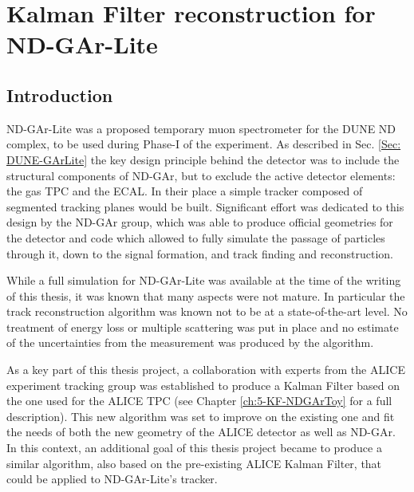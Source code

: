 


\chapter{\label{ch:4-KF-NDGArLite}Kalman Filter reconstruction for ND-GAr-Lite}
\minitoc

\section{Introduction}
ND-GAr-Lite was a proposed temporary muon spectrometer  for the DUNE ND complex, to be used during Phase-I of the experiment. As described in Sec. \ref{Sec: DUNE-GArLite} the key design principle behind the detector was to include the structural components of ND-GAr, but to exclude the active detector elements: the gas TPC and the ECAL. In their place a simple tracker composed of segmented tracking planes would be built. Significant effort was dedicated to this design by the ND-GAr group, which was able to produce official geometries for the detector and code which allowed to fully simulate the passage of particles through it, down to the signal formation, and track finding and reconstruction.

While a full simulation for ND-GAr-Lite was available at the time of the writing of this thesis, it was known that many aspects were not mature. In particular the track reconstruction algorithm was known not to be at a state-of-the-art level. No treatment of energy loss or multiple scattering was put in place and no estimate of the uncertainties from the measurement was produced by the algorithm.

As a key part of this thesis project, a collaboration with experts from the ALICE experiment tracking group was established to produce a Kalman Filter based on the one used for the ALICE TPC (see Chapter \ref{ch:5-KF-NDGArToy} for a full description). This new algorithm was set to improve on the existing one and fit the needs of both the new geometry of the ALICE detector as well as ND-GAr. In this context, an additional goal of this thesis project became to produce a similar algorithm, also based on the pre-existing ALICE Kalman Filter, that could be applied to ND-GAr-Lite's tracker. 

